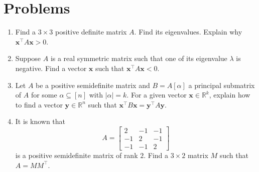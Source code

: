 \documentclass{article}
\newcommand{\trans}{^\top}
\newcommand{\bx}{\mathbf{x}}
\newcommand{\by}{\mathbf{y}}
\theoremstyle{definition}
\begin{document}
\section*{Problems}
\begin{enumerate}
\setlength\itemsep{2em}
\item Find a $3\times 3$ positive definite matrix $A$.  Find its eigenvalues.  Explain why $\bx\trans A\bx > 0$.
\item Suppose $A$ is a real symmetric matrix such that one of its eigenvalue $\lambda$ is negative.  Find a vector $\bx$ such that $\bx\trans A\bx < 0$.
\item Let $A$ be a positive semidefinite matrix and $B = A[\alpha]$ a principal submatrix of $A$ for some $\alpha\subseteq[n]$ with $|\alpha| = k$.  For a given vector $\bx\in\mathbb{R}^k$, explain how to find a vector $\by\in\mathbb{R}^n$  such that $\bx\trans B\bx = \by\trans A\by$.  
\item It is known that  
\[A = \begin{bmatrix}
 2 & -1 & -1 \\
 -1 & 2 & -1 \\
 -1 & -1 & 2
\end{bmatrix}\] 
is a positive semidefinite matrix of rank $2$.  Find a $3\times 2$ matrix $M$ such that $A = MM\trans$.
\end{enumerate}

\end{document}
